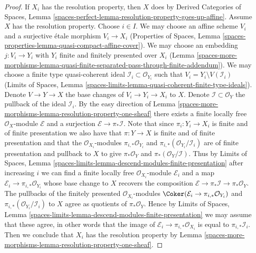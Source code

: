 \begin{proof}
If $X_i$ has the resolution property, then $X$ does by
Derived Categories of Spaces, Lemma
\ref{spaces-perfect-lemma-resolution-property-goes-up-affine}.
Assume $X$ has the resolution property.
Choose $i \in I$. We may choose an affine scheme $V_i$ and a surjective
\'etale morphism $V_i \to X_i$
(Properties of Spaces, Lemma
\ref{spaces-properties-lemma-quasi-compact-affine-cover}).
We may choose an embedding $j : V_i \to Y_i$
with $Y_i$ finite and finitely presented over $X_i$
(Lemma \ref{spaces-more-morphisms-lemma-quasi-finite-separated-pass-through-finite-addendum}).
We may choose a finite type
quasi-coherent ideal $\mathcal{I}_i \subset \mathcal{O}_{Y_i}$
such that $V_i = Y_i \setminus V(\mathcal{I}_i)$
(Limits of Spaces, Lemma
\ref{spaces-limits-lemma-quasi-coherent-finite-type-ideals}).
Denote $V \to Y \to X$ the base changes of $V_i \to Y_i \to X_i$
to $X$. Denote $\mathcal{I} \subset \mathcal{O}_Y$ the pullback
of the ideal $\mathcal{I}_i$. By the easy direction of
Lemma \ref{spaces-more-morphisms-lemma-resolution-property-one-sheaf}
there exists a finite locally free $\mathcal{O}_X$-module
$\mathcal{E}$ and a surjection $\mathcal{E} \to \pi_*\mathcal{I}$.
Note that since $\pi_i : Y_i \to X_i$ is finite and of finite presentation
we also have that $\pi : Y \to X$ is finite and of finite presentation
and that the $\mathcal{O}_{X_i}$-modules
$\pi_{i, *}\mathcal{O}_{Y_i}$ and
$\pi_{i, *}(\mathcal{O}_{Y_i}/\mathcal{I}_i)$
are of finite presentation and pullback to $X$ to give
$\pi_*\mathcal{O}_Y$ and
$\pi_*(\mathcal{O}_Y/\mathcal{I})$. Thus by Limits of Spaces, Lemma
\ref{spaces-limits-lemma-descend-modules-finite-presentation}
after increasing $i$ we can find a finite locally free
$\mathcal{O}_{X_i}$-module $\mathcal{E}_i$
and a map $\mathcal{E}_i \to \pi_{i, *}\mathcal{O}_{Y_i}$
whose base change to $X$ recovers the composition
$\mathcal{E} \to \pi_*\mathcal{I} \to \pi_*\mathcal{O}_Y$.
The pullbacks of the finitely presented $\mathcal{O}_{X_i}$-modules
$\Coker(\mathcal{E}_i \to \pi_{i, *}\mathcal{O}_{Y_i})$
and $\pi_{i, *}(\mathcal{O}_{Y_i}/\mathcal{I}_i)$
to $X$ agree as quotients of $\pi_*\mathcal{O}_Y$.
Hence by Limits of Spaces, Lemma
\ref{spaces-limits-lemma-descend-modules-finite-presentation}
we may assume that these agree, in other words that
the image of $\mathcal{E}_i \to \pi_{i, *}\mathcal{O}_{X_i}$
is equal to $\pi_{i, *}\mathcal{I}_i$.
Then we conclude that $X_i$ has the resolution property by
Lemma \ref{spaces-more-morphisms-lemma-resolution-property-one-sheaf}.
\end{proof}

